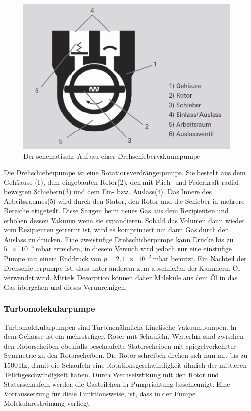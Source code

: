 			\begin{figure}
				\centering
				\includegraphics[width=0.5\linewidth]{"latex/images/Drehschieber.png"}
				\caption{Der schematische Aufbau einer Drehschiebervakuumpumpe}
				\label{fig:dreh}
			\end{figure} Die Drehschieberpumpe ist eine Rotationsverdrängerpumpe. 
			Sie besteht aus dem Gehäause (1), dem eingebauten Rotor(2), den mit Flieh- und Federkraft radial bewegten Schiebern(3) und dem Ein- bzw. Auslass(4). 
			Das Innere des Arbeitsraumes(5) wird durch den Stator, den Rotor und die Schieber in mehrere Bereiche eingeteilt. 
			Diese Saugen beim neues Gas aus dem Rezipienten und erhöhen dessen Vakuum wenn sie expandieren.
			Sobald das Volumen dann wieder vom Rezipienten getrennt ist, wird es komprimiert um dann Gas durch den Auslass zu drücken.
			Eine zweistufige Drehschieberpumpe kann Drücke bis zu $\SI{5e-4}{\milli\bar}$ erreichen, in diesem Versuch wird jedoch nur eine einstufige Pumpe mit einem Enddruck von $p = \SI{2.1 e-2}{\milli\bar}$ benutzt.
			Ein Nachteil der Drehschieberpumpe ist, dass unter anderem zum abschließen der Kammern, Öl verwendet wird.
			Mittels Desorption können daher Moleküle aus dem Öl in das Gas übergehen und dieses Verunreinigen.	 

			\cite{pfeiffer}
		\subsubsection{Turbomolekularpumpe}
		
			\cite{pfeiffer}
			Turbomolekularpumpen sind Turbinenähnliche kinetische Vakuumpumpen. 
			In dem Gehäuse ist ein mehrstufiger, Roter mit Schaufeln.
			Weiterhin sind zwischen den Rotorscheiben ebenfalls beschaufelte Statorscheiben mit spiegelverkehrter Symmetrie zu den Rotorscheiben.
			Die Rotor schreiben drehen sich nun mit bis zu $\SI{1500}{\hertz}$, damit die Schaufeln eine Rotationsgeschwindigkeit ähnlich der mittleren Teilchgeschwindigkeit haben. 
			Durch Wechselwirkung mit den Rotor und Statorschaufeln werden die Gasteilchen in Pumprichtung beschleunigt.
			Eine Vorraussetzung für diese Funktionsweise, ist, dass in der Pumpe Molekulareströmung vorliegt.
			  						

